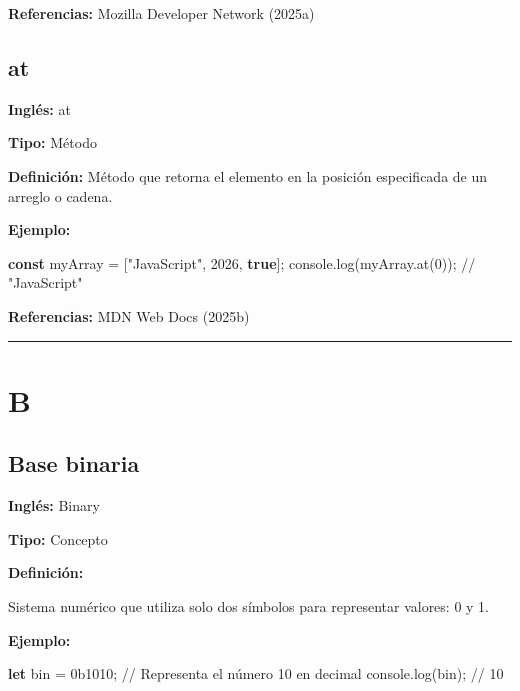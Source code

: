 \documentclass[
  letterpaper,
  DIV=11,
  numbers=noendperiod]{scrreprt}
\newenvironment{Shaded}{\begin{snugshade}}{\end{snugshade}}
\newcommand{\BaseNTok}[1]{\textcolor[rgb]{0.68,0.00,0.00}{#1}}
\newcommand{\BuiltInTok}[1]{\textcolor[rgb]{0.00,0.23,0.31}{#1}}
\newcommand{\CommentTok}[1]{\textcolor[rgb]{0.37,0.37,0.37}{#1}}
\newcommand{\DecValTok}[1]{\textcolor[rgb]{0.68,0.00,0.00}{#1}}
\newcommand{\FunctionTok}[1]{\textcolor[rgb]{0.28,0.35,0.67}{#1}}
\newcommand{\KeywordTok}[1]{\textcolor[rgb]{0.00,0.23,0.31}{\textbf{#1}}}
\newcommand{\NormalTok}[1]{\textcolor[rgb]{0.00,0.23,0.31}{#1}}
\newcommand{\OperatorTok}[1]{\textcolor[rgb]{0.37,0.37,0.37}{#1}}
\newcommand{\StringTok}[1]{\textcolor[rgb]{0.13,0.47,0.30}{#1}}
\let\oldsubsection\subsection
\renewcommand{\subsection}{\phantomsection\oldsubsection}
\begin{document}
\textbf{Referencias:} Mozilla Developer Network (2025a)

\subsection*{at}\label{glos-at}

\textbf{Inglés:} at

\textbf{Tipo:} Método

\textbf{Definición:} Método que retorna el elemento en la posición
especificada de un arreglo o cadena.

\textbf{Ejemplo:}

\begin{Shaded}
\begin{Highlighting}[]
\KeywordTok{const}\NormalTok{ myArray }\OperatorTok{=}\NormalTok{ [}\StringTok{"JavaScript"}\OperatorTok{,} \DecValTok{2026}\OperatorTok{,} \KeywordTok{true}\NormalTok{]}\OperatorTok{;}
\BuiltInTok{console}\OperatorTok{.}\FunctionTok{log}\NormalTok{(myArray}\OperatorTok{.}\FunctionTok{at}\NormalTok{(}\DecValTok{0}\NormalTok{))}\OperatorTok{;} \CommentTok{// "JavaScript"}
\end{Highlighting}
\end{Shaded}

\textbf{Referencias:} MDN Web Docs (2025b)

\begin{center}\rule{0.5\linewidth}{0.5pt}\end{center}

\section*{B}\label{b}


\subsection*{Base binaria}\label{glos-binaria}

\textbf{Inglés:} Binary

\textbf{Tipo:} Concepto

\textbf{Definición:}

Sistema numérico que utiliza solo dos símbolos para representar valores:
0 y 1.

\textbf{Ejemplo:}

\begin{Shaded}
\begin{Highlighting}[]
\KeywordTok{let}\NormalTok{ bin }\OperatorTok{=} \BaseNTok{0b1010}\OperatorTok{;} \CommentTok{// Representa el número 10 en decimal}
\BuiltInTok{console}\OperatorTok{.}\FunctionTok{log}\NormalTok{(bin)}\OperatorTok{;} \CommentTok{// 10}
\end{Highlighting}
\end{Shaded}
\end{document}
